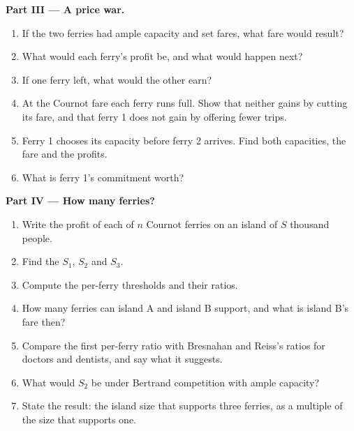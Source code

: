 \begin{problem}
\medskip\noindent\textbf{Part III --- A price war.}
\begin{enumerate}[resume]
  \item If the two ferries had ample capacity and set fares, what fare would result?
  \item What would each ferry's profit be, and what would happen next?
  \item If one ferry left, what would the other earn?
  \item At the Cournot fare each ferry runs full. Show that neither gains by cutting its fare, and that ferry 1 does not gain by offering fewer trips.
  \item Ferry 1 chooses its capacity before ferry 2 arrives. Find both capacities, the fare and the profits.
  \item What is ferry 1's commitment worth?
\end{enumerate}

\medskip\noindent\textbf{Part IV --- How many ferries?}
\begin{enumerate}[resume]
  \item Write the profit of each of $n$ Cournot ferries on an island of $S$ thousand people.
  \item Find the  $S_1$, $S_2$ and $S_3$.
  \item Compute the per-ferry thresholds and their ratios.
  \item How many ferries can island A and island B support, and what is island B's fare then?
  \item Compare the first per-ferry ratio with Bresnahan and Reiss's ratios for doctors and dentists, and say what it suggests.
  \item What would $S_2$ be under Bertrand competition with ample capacity?
  \item State the result: the island size that supports three ferries, as a multiple of the size that supports one.
\end{enumerate}
\end{problem}
